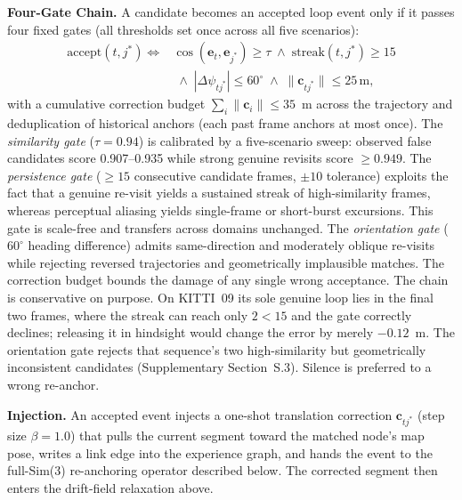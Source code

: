 \textbf{Four-Gate Chain.} A candidate becomes an accepted loop event only if it passes four fixed gates (all thresholds set once across all five scenarios):
\begin{align}
    \mathrm{accept}(t, j^{*}) \iff{}
    & \cos(\mathbf{e}_t, \mathbf{e}_{j^{*}}) \ge \tau
    \;\wedge\; \mathrm{streak}(t, j^{*}) \ge 15 \nonumber\\
    &\;\wedge\; |\Delta\psi_{t j^{*}}| \le 60^{\circ}
    \;\wedge\; \lVert \mathbf{c}_{t j^{*}} \rVert \le 25\,\mathrm{m},
    \label{eq:pr_gates}
\end{align}
with a cumulative correction budget $\sum_i \lVert \mathbf{c}_i \rVert \le 35$~m across the trajectory and deduplication of historical anchors (each past frame anchors at most once). The \emph{similarity gate} ($\tau = 0.94$) is calibrated by a five-scenario sweep: observed false candidates score 0.907--0.935 while strong genuine revisits score $\ge 0.949$. The \emph{persistence gate} ($\ge 15$ consecutive candidate frames, $\pm 10$ tolerance) exploits the fact that a genuine re-visit yields a sustained streak of high-similarity frames, whereas perceptual aliasing yields single-frame or short-burst excursions. This gate is scale-free and transfers across domains unchanged. The \emph{orientation gate} ($60^{\circ}$ heading difference) admits same-direction and moderately oblique re-visits while rejecting reversed trajectories and geometrically implausible matches. The correction budget bounds the damage of any single wrong acceptance. The chain is conservative on purpose. On KITTI~09 its sole genuine loop lies in the final two frames, where the streak can reach only $2 < 15$ and the gate correctly declines; releasing it in hindsight would change the error by merely $-0.12$~m. The orientation gate rejects that sequence's two high-similarity but geometrically inconsistent candidates (Supplementary Section~S.3). Silence is preferred to a wrong re-anchor.

\textbf{Injection.} An accepted event injects a one-shot translation correction $\mathbf{c}_{t j^{*}}$ (step size $\beta = 1.0$) that pulls the current segment toward the matched node's map pose, writes a link edge into the experience graph, and hands the event to the full-Sim(3) re-anchoring operator described below. The corrected segment then enters the drift-field relaxation above.

